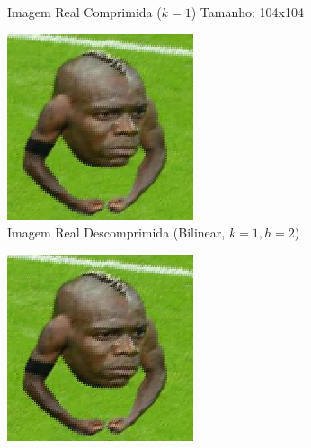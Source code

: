 \documentclass[12pt, a4paper]{article}
\begin{document}
\begin{figure}[H]
\begin{subfigure}[b]{0.45\textwidth}
        \caption{Imagem Real Comprimida ($k=1$) Tamanho: 104x104}
        \label{fig:selva_compressed_k1}
    \end{subfigure}
    
    \vspace{0.5cm}
    
    \begin{subfigure}[b]{0.45\textwidth}
        \centering
        \includegraphics[width=\textwidth]{results/case_6/bilinear_decompressed_k1_h2.png}
        \caption{Imagem Real Descomprimida (Bilinear, $k=1, h=2$)}
        \label{fig:selva_bilinear_k1}
    \end{subfigure}
    \hfill
    \begin{subfigure}[b]{0.45\textwidth}
        \centering
        \includegraphics[width=\textwidth]{results/case_6/bicubic_decompressed_k1_h2.png}

\end{subfigure}
\end{figure}
\end{document}
